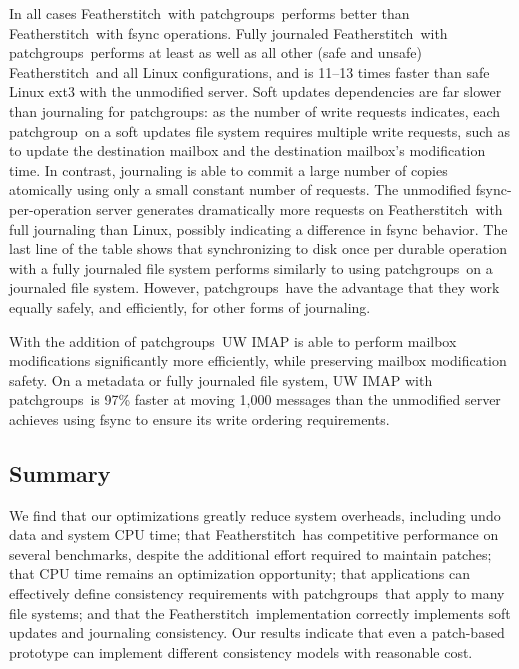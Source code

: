 \documentclass[9pt,twocolumn,letterpaper]{article}
\newcommand{\Kudos}{Featherstitch}
\newcommand{\patchgroup}{patchgroup}
\newcommand{\patchgroups}{patchgroups}
\begin{document}
In all cases \Kudos\ with \patchgroups\ performs better than \Kudos\ with
fsync operations.
%
Fully journaled \Kudos\ with \patchgroups\ performs at least as well
as all other (safe and unsafe) \Kudos\ and all Linux configurations, and is
11--13 times faster than safe Linux ext3 with the unmodified
server.
%
Soft updates dependencies are far slower than journaling for \patchgroups:
as the number of write requests
indicates, each \patchgroup\ on a soft updates file system requires
multiple write requests, such as to update the destination mailbox and
the destination mailbox's modification time. In contrast, journaling
is able to commit a large number of copies atomically using only a
small constant number of requests.
%
The unmodified fsync-per-operation server generates dramatically more
requests on \Kudos\ with full journaling than Linux, possibly indicating a
difference in fsync behavior.
%
The last line of the table shows that synchronizing to disk once per
durable operation with a fully journaled file system performs similarly to
using \patchgroups\ on a journaled file system. However, \patchgroups\
have the advantage that they work equally safely, and efficiently, for
other forms of journaling.



\imaptable{}

With the addition of \patchgroups\ UW IMAP is able to perform mailbox
modifications significantly more efficiently, while preserving mailbox
modification safety. On a metadata or fully journaled file system, UW
IMAP with \patchgroups\ is 97\% faster at moving 1,000 messages than
the unmodified server achieves using fsync to ensure its write
ordering requirements.


\subsection{Summary}
\label{sec:evaluation:summary}

We find
%
that our optimizations greatly reduce system overheads, including
undo data and system CPU time;
%
that \Kudos\ has competitive performance on several benchmarks,
despite the additional effort required to maintain patches;
%
that CPU time remains an optimization opportunity;
%
that applications can effectively define consistency requirements with
\patchgroups\ that apply to many file systems;
%
and that the \Kudos\ implementation correctly
implements soft updates and journaling consistency.
%
Our results indicate that even a patch-based prototype
can implement different consistency models with reasonable cost.
\end{document}

